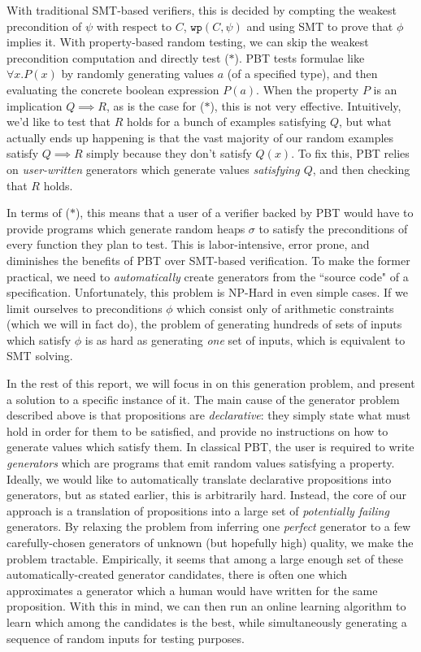 \documentclass[10pt,a4paper]{article}
\begin{document}
With traditional SMT-based verifiers, this is decided by compting the weakest precondition of $\psi$ with respect to $C$, $\texttt{wp}(C,\psi)$ and using SMT to prove that $\phi$ implies it. With property-based random testing, we can skip the weakest precondition computation and directly test ($\ast$). PBT tests formulae like $\forall x. P(x)$ by randomly generating values $a$ (of a specified type), and then evaluating the concrete boolean expression $P(a)$. When the property $P$ is an implication $Q \implies R$, as is the case for ($\ast$), this is not very effective. Intuitively, we'd like to test that $R$ holds for a bunch of examples satisfying $Q$, but what actually ends up happening is that the vast majority of our random examples satisfy $Q \implies R$ simply because they don't satisfy $Q(x)$. To fix this, PBT relies on \textit{user-written} generators which generate values \textit{satisfying $Q$}, and then checking that $R$ holds.

In terms of ($\ast$), this means that a user of a verifier backed by PBT would have to provide programs which generate random heaps $\sigma$ to satisfy the preconditions of every function they plan to test. This is labor-intensive, error prone, and diminishes the benefits of PBT over SMT-based verification. To make the former practical, we need to \textit{automatically} create generators from the ``source code" of a specification. Unfortunately, this problem is NP-Hard in even simple cases. If we limit ourselves to preconditions $\phi$ which consist only of arithmetic constraints (which we will in fact do), the problem of generating hundreds of sets of inputs which satisfy $\phi$ is as hard as generating \textit{one} set of inputs, which is equivalent to SMT solving.

In the rest of this report, we will focus in on this generation problem, and present a solution to a specific instance of it. The main cause of the generator problem described above is that propositions are \textit{declarative}: they simply state what must hold in order for them to be satisfied, and provide no instructions on how to generate values which satisfy them. In classical PBT, the user is required to write \textit{generators} which are programs that emit random values satisfying a property. Ideally, we would like to automatically translate declarative propositions into generators, but as stated earlier, this is arbitrarily hard. Instead, the core of our approach is a translation of propositions into a large set of \textit{potentially failing} generators. By relaxing the problem from inferring one \textit{perfect} generator to a few carefully-chosen generators of unknown (but hopefully high) quality, we make the problem tractable. Empirically, it seems that among a large enough set of these automatically-created generator candidates, there is often one which approximates a generator which a human would have written for the same proposition. With this in mind, we can then run an online learning algorithm to learn which among the candidates is the best, while simultaneously generating a sequence of random inputs for testing purposes.
\end{document}
